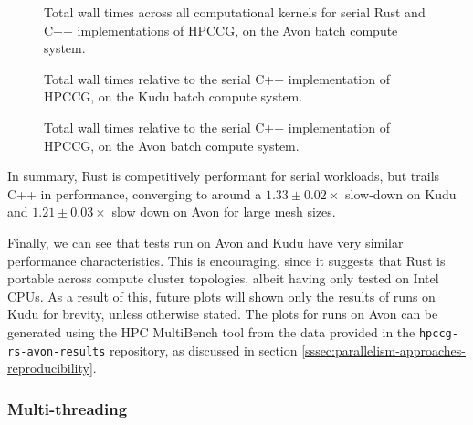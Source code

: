 \begin{figure}[H]
    \centering
    \fbox{}
    \captionsetup{skip=0pt}
    \caption{Total wall times across all computational kernels for serial Rust and C++ implementations of \acrshort{HPCCG}, on the Avon batch compute system.}
    \label{fig:1_serial_line_avon}
\end{figure}

\begin{figure}[H]
    \centering
    \fbox{}
    \captionsetup{skip=0pt}
    \caption{Total wall times relative to the serial C++ implementation of \acrshort{HPCCG}, on the Kudu batch compute system.}
    \label{fig:2_serial_line_relative}
\end{figure}

\begin{figure}[H]
    \centering
    \fbox{}
    \captionsetup{skip=0pt}
    \caption{Total wall times relative to the serial C++ implementation of \acrshort{HPCCG}, on the Avon batch compute system.}
    \label{fig:2_serial_line_relative_avon}
\end{figure}


In summary, Rust is competitively performant for serial workloads, but trails C++ in performance, converging to around a $1.33 \pm 0.02 \times$ slow-down on Kudu and $1.21 \pm 0.03 \times$ slow down on Avon for large mesh sizes.

Finally, we can see that tests run on Avon and Kudu have very similar performance characteristics. This is encouraging, since it suggests that Rust is portable across compute cluster topologies, albeit having only tested on Intel CPUs. As a result of this, future plots will shown only the results of runs on Kudu for brevity, unless otherwise stated. The plots for runs on Avon can be generated using the HPC MultiBench tool from the data provided in the \texttt{hpccg-rs-avon-results} repository, as discussed in section \ref{sssec:parallelism-approaches-reproducibility}.

\subsubsection{Multi-threading}
\label{sssec:multi-threaded}


